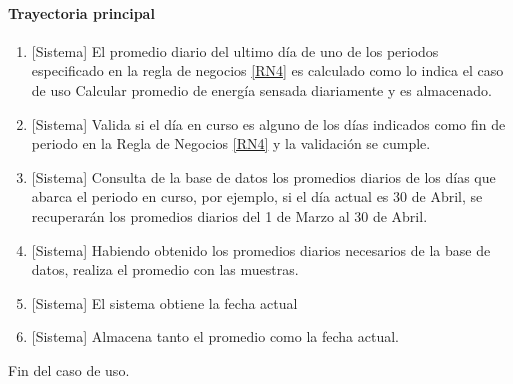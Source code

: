 \paragraph{Trayectoria principal}
	\begin{enumerate}
		\item {[Sistema]} El promedio diario del ultimo día de uno de los periodos especificado en la regla de negocios \ref{RN4} es calculado como lo indica el caso de uso Calcular promedio de energía sensada diariamente y es almacenado.
		\item  {[Sistema]} Valida si el día en curso es alguno de los días indicados como fin de periodo en la Regla de Negocios \ref{RN4} y la validación se cumple.
		\item  {[Sistema]} Consulta de la base de datos los promedios diarios de los días que abarca el periodo en curso, por ejemplo, si el día actual es 30 de Abril, se recuperarán los promedios diarios del 1 de Marzo al 30 de Abril.
		\item {[Sistema]} Habiendo obtenido los promedios diarios necesarios de la base de datos, realiza el promedio con las muestras.
		\item {[Sistema]} El sistema obtiene la fecha actual
		\item {[Sistema]} Almacena tanto el promedio como la fecha actual.
	\end{enumerate}
	Fin del caso de uso.



